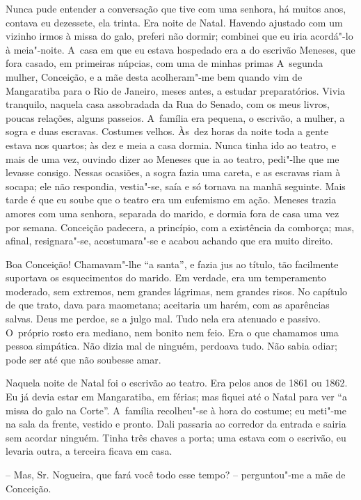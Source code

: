 Nunca pude entender a conversação que tive com uma senhora, há muitos
anos, contava eu dezessete, ela trinta. Era noite de Natal. Havendo
ajustado com um vizinho irmos à missa do galo, preferi não dormir;
combinei que eu iria acordá"-lo à meia"-noite. A~casa em que eu estava
hospedado era a do escrivão Meneses, que fora casado, em primeiras
núpcias, com uma de minhas primas A~segunda mulher, Conceição, e a mãe
desta acolheram"-me bem quando vim de Mangaratiba para o Rio de Janeiro,
meses antes, a estudar preparatórios. Vivia tranquilo, naquela casa
assobradada da Rua do Senado, com os meus livros, poucas relações,
alguns passeios. A~família era pequena, o escrivão, a mulher, a sogra e
duas escravas. Costumes velhos. Às~dez horas da noite toda a gente
estava nos quartos; às dez e meia a casa dormia. Nunca tinha ido ao
teatro, e mais de uma vez, ouvindo dizer ao Meneses que ia ao teatro,
pedi"-lhe que me levasse consigo. Nessas ocasiões, a sogra fazia uma
careta, e as escravas riam à socapa; ele não respondia, vestia"-se, saía
e só tornava na manhã seguinte. Mais tarde é que eu soube que o teatro
era um eufemismo em ação. Meneses trazia amores com uma senhora,
separada do marido, e dormia fora de casa uma vez por semana. Conceição
padecera, a princípio, com a existência da comborça; mas, afinal,
resignara"-se, acostumara"-se e acabou achando que era muito direito.

Boa Conceição! Chamavam"-lhe ``a santa'', e fazia jus ao título, tão
facilmente suportava os esquecimentos do marido. Em verdade, era um
temperamento moderado, sem extremos, nem grandes lágrimas, nem grandes
risos. No capítulo de que trato, dava para maometana; aceitaria um
harém, com as aparências salvas. Deus me perdoe, se a julgo mal. Tudo
nela era atenuado e passivo. O~próprio rosto era mediano, nem bonito nem
feio. Era o que chamamos uma pessoa simpática. Não dizia mal de ninguém,
perdoava tudo. Não sabia odiar; pode ser até que não soubesse amar.

Naquela noite de Natal foi o escrivão ao teatro. Era pelos anos de 1861
ou 1862. Eu já devia estar em Mangaratiba, em férias; mas fiquei até o
Natal para ver ``a missa do galo na Corte''. A~família recolheu"-se à
hora do costume; eu meti"-me na sala da frente, vestido e pronto. Dali
passaria ao corredor da entrada e sairia sem acordar ninguém. Tinha três
chaves a porta; uma estava com o escrivão, eu levaria outra, a terceira
ficava em casa.

-- Mas, Sr. Nogueira, que fará você todo esse tempo? -- perguntou"-me a
mãe de Conceição.

